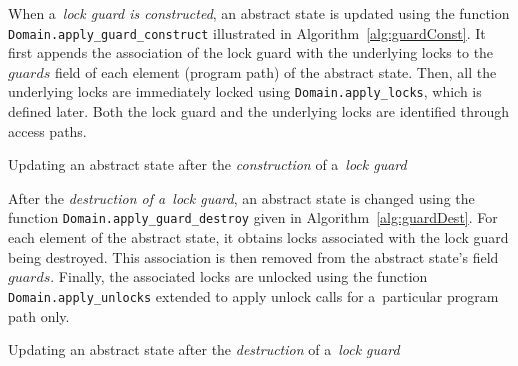 When a~\emph{lock guard is constructed}, an abstract state is updated using the function \texttt{Domain.apply\_guard\_construct} illustrated in Algorithm~\ref{alg:guardConst}. It first appends the association of the lock guard with the underlying locks to the $ guards $ field of each element (program path) of the abstract state. Then, all the underlying locks are immediately locked using \texttt{Domain.apply\_locks}, which is defined later. Both the lock guard and the underlying locks are identified through access paths.

\begin{algorithm}[hbt]
%
%
    \caption{Updating an abstract state after the \emph{construction} of a~\emph{lock guard}}
    \label{alg:guardConst}
\end{algorithm}

After the \emph{destruction of a~lock guard}, an abstract state is changed using the function \texttt{Domain.apply\_guard\_destroy} given in Algorithm~\ref{alg:guardDest}. For each element of the abstract state, it obtains locks associated with the lock guard being destroyed. This association is then removed from the abstract state's field $ guards $. Finally, the associated locks are unlocked using the function \texttt{Domain.apply\_unlocks} extended to apply unlock calls for a~particular program path only.

\begin{algorithm}[hbt]
%
%
    \caption{Updating an abstract state after the \emph{destruction} of a~\emph{lock guard}}
    \label{alg:guardDest}
\end{algorithm}

